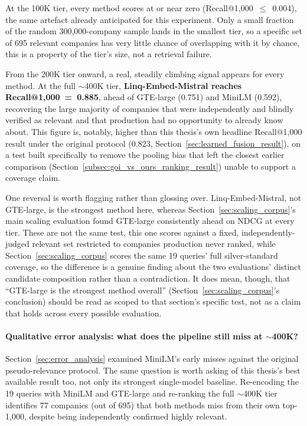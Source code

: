 \documentclass[a4paper,oneside,bibliography=totoc]{scrbook}
\begin{document}
At the 100K tier, every method scores at or near zero (Recall@1{,}000~$\leq$~0.004), the same artefact already anticipated for this experiment. Only a small fraction of the random 300{,}000-company sample lands in the smallest tier, so a specific set of 695 relevant companies has very little chance of overlapping with it by chance, this is a property of the tier's size, not a retrieval failure.

From the 200K tier onward, a real, steadily climbing signal appears for every method. At the full $\sim$400K tier, \textbf{Linq-Embed-Mistral reaches Recall@1{,}000~=~0.885}, ahead of GTE-large (0.751) and MiniLM (0.592), recovering the large majority of companies that were independently and blindly verified as relevant and that production had no opportunity to already know about. This figure is, notably, higher than this thesis's own headline Recall@1{,}000 result under the original protocol (0.823, Section~\ref{sec:learned_fusion_result}), on a test built specifically to remove the pooling bias that left the closest earlier comparison (Section~\ref{subsec:goi_vs_ours_ranking_result}) unable to support a coverage claim.

One reversal is worth flagging rather than glossing over. Linq-Embed-Mistral, not GTE-large, is the strongest method here, whereas Section~\ref{sec:scaling_corpus}'s main scaling evaluation found GTE-large consistently ahead on NDCG at every tier. These are not the same test, this one scores against a fixed, independently-judged relevant set restricted to companies production never ranked, while Section~\ref{sec:scaling_corpus} scores the same 19 queries' full silver-standard coverage, so the difference is a genuine finding about the two evaluations' distinct candidate composition rather than a contradiction. It does mean, though, that ``GTE-large is the strongest method overall'' (Section~\ref{sec:scaling_corpus}'s conclusion) should be read as scoped to that section's specific test, not as a claim that holds across every possible evaluation.

\paragraph{Qualitative error analysis: what does the pipeline still miss at $\sim$400K?} Section~\ref{sec:error_analysis} examined MiniLM's early misses against the original pseudo-relevance protocol. The same question is worth asking of this thesis's best available result too, not only its strongest single-model baseline. Re-encoding the 19 queries with MiniLM and GTE-large and re-ranking the full $\sim$400K tier identifies 77 companies (out of 695) that both methods miss from their own top-1{,}000, despite being independently confirmed highly relevant.
\end{document}
